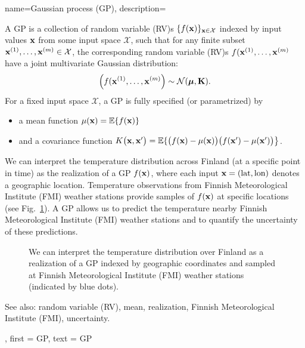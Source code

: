 {name={Gaussian process (GP)},
  description={A GP is a collection of random variable (RV)s 
  	$\{f({\bf x})\}_{{\bf x} \in \mathcal{X}}$ indexed by input values ${\bf x}$ 
  	from some input space $\mathcal{X}$, such that for any finite subset 
  	${\bf x}^{(1)}, \ldots, {\bf x}^{(m)} \in \mathcal{X}$, 
  	the corresponding random variable (RV)s $f({\bf x}^{(1)}, \ldots, {\bf x}^{(m)}$ have a joint 
  	multivariate Gaussian distribution:
  	\[
  	\left( f({\bf x}^{(1)}, \ldots, {\bf x}^{(m)} \right) \sim \mathcal{N}(\boldsymbol{\mu}, \mathbf{K}).
  	\]
  	For a fixed input space $\mathcal{X}$, a GP is fully specified (or parametrized) by 
  	\begin{itemize}
  		\item a mean function $\mu({\bf x}) = \mathbb{E} \{ f({\bf x})\}$
  		\item and a covariance function $K\big({\bf x},{\bf x}'\big)= \mathbb{E} \{ \big(f({\bf x})-\mu({\bf x})\big) \big(f({\bf x}')-\mu({\bf x}')\big) \big\}$.
  	\end{itemize}
  	 We can interpret the temperature distribution across Finland (at a specific 
  	point in time) as the realization of a GP $f({\bf x})$, where each input ${\bf x} = (\text{lat}, \text{lon})$ 
  	denotes a geographic location. Temperature observations from Finnish Meteorological Institute (FMI) weather stations provide 
  	samples of $f({\bf x})$ at specific locations (see Fig.\ \ref{fig_gp_FMI}). A GP allows us to 
  	predict the temperature nearby Finnish Meteorological Institute (FMI) weather stations and to quantify the uncertainty 
  	of these predictions. 
  	\begin{figure}[H]
  	\begin{center}
\vspace*{-15mm}
\end{center}
\caption{We can interpret the temperature distribution over Finland as a realization 
	of a GP indexed by geographic coordinates and sampled at Finnish Meteorological Institute (FMI) weather stations (indicated by 
	blue dots). \label{fig_gp_FMI}}
\end{figure}
See also: random variable (RV), mean, realization, Finnish Meteorological Institute (FMI), uncertainty.}, 
first = {GP}, 
text = {GP}
}

